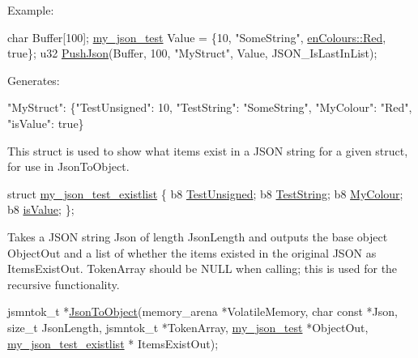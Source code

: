 Example\+: 
\begin{DoxyCode}
\textcolor{keywordtype}{char} Buffer[100];
\hyperlink{structmy__json__test}{my\_json\_test} Value = \{10, \textcolor{stringliteral}{"SomeString"}, \hyperlink{PreprocTest_8h_a081cf1a0e70d6e2bd48c98f457742877aee38e4d5dd68c4e440825018d549cb47}{enColours::Red}, \textcolor{keyword}{true}\};
u32 \hyperlink{Generated__Test_8h_ad8caeb90f89cac9c8978390dc8ec420a}{PushJson}(Buffer, 100, \textcolor{stringliteral}{"MyStruct"}, Value, JSON\_IsLastInList);
\end{DoxyCode}


Generates\+: 
\begin{DoxyCode}
"MyStruct": \{"TestUnsigned": 10, "TestString": "SomeString", "MyColour": "Red", "isValue": true\}
\end{DoxyCode}


This struct is used to show what items exist in a J\+S\+ON string for a given struct, for use in {\ttfamily Json\+To\+Object}. 
\begin{DoxyCode}
\textcolor{keyword}{struct }\hyperlink{structmy__json__test__existlist}{my\_json\_test\_existlist}
\{
   b8 \hyperlink{structmy__json__test__existlist_abcc3320a088be44f3780f7768da67efa}{TestUnsigned};
   b8 \hyperlink{structmy__json__test__existlist_ad1bf35a0d6153e177322567228ae0203}{TestString};
   b8 \hyperlink{structmy__json__test__existlist_adc7bd401b4e560999733be88e43b5b7f}{MyColour};
   b8 \hyperlink{structmy__json__test__existlist_ad8b82af159a6dd0709800ca082156caf}{isValue};
\};
\end{DoxyCode}


Takes a J\+S\+ON string {\ttfamily Json} of length {\ttfamily Json\+Length} and outputs the base object {\ttfamily Object\+Out} and a list of whether the items existed in the original J\+S\+ON as {\ttfamily Items\+Exist\+Out}. {\ttfamily Token\+Array} should be {\ttfamily N\+U\+LL} when calling; this is used for the recursive functionality. 
\begin{DoxyCode}
jsmntok\_t *\hyperlink{Generated__Test_8h_a64411d75ccfa768d32520dac899352f3}{JsonToObject}(memory\_arena *VolatileMemory, \textcolor{keywordtype}{char} \textcolor{keyword}{const} *Json, \textcolor{keywordtype}{size\_t} JsonLength, 
      jsmntok\_t *TokenArray, \hyperlink{structmy__json__test}{my\_json\_test} *ObjectOut, \hyperlink{structmy__json__test__existlist}{my\_json\_test\_existlist} *
      ItemsExistOut);
\end{DoxyCode}


